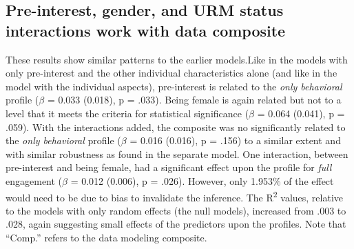 \documentclass[]{msu-thesis}
\theoremstyle{definition}
\theoremstyle{definition}
\theoremstyle{definition}
\theoremstyle{remark}
\begin{document}
\begin{landscape}\begin{table}

\caption{\label{tab:unnamed-chunk-14}Results of mixed effects models with interest and other characteristics}
\centering
{}
\end{table}
\end{landscape}

\subsection{Pre-interest, gender, and URM status interactions work with
data
composite}\label{pre-interest-gender-and-urm-status-interactions-work-with-data-composite}

These results show similar patterns to the earlier models.Like in the
models with only pre-interest and the other individual characteristics
alone (and like in the model with the individual aspects), pre-interest
is related to the \emph{only behavioral} profile (\(\beta\) = 0.033
(0.018), p = .033). Being female is again related but not to a level
that it meets the criteria for statistical significance (\(\beta\) =
0.064 (0.041), p = .059). With the interactions added, the composite was
no significantly related to the \emph{only behavioral} profile
(\(\beta\) = 0.016 (0.016), p = .156) to a similar extent and with
similar robustness as found in the separate model. One interaction,
between pre-interest and being female, had a significant effect upon the
profile for \emph{full} engagement (\(\beta\) = 0.012 (0.006), p =
.026). However, only 1.953\% of the effect would need to be due to bias
to invalidate the inference. The R\textsuperscript{2} values, relative
to the models with only random effects (the null models), increased from
.003 to .028, again suggesting small effects of the predictors upon the
profiles. Note that ``Comp.'' refers to the data modeling composite.
\end{document}
